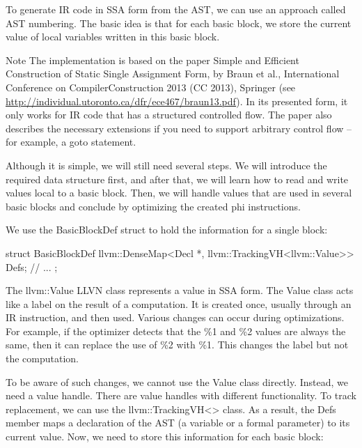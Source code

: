 
To generate IR code in SSA form from the AST, we can use an approach called AST numbering. The basic idea is that for each basic block, we store the current value of local variables written in this basic block.

\begin{myNotic}{Note}
The implementation is based on the paper Simple and Efficient Construction of Static Single Assignment Form, by Braun et al., International Conference on CompilerConstruction 2013 (CC 2013), Springer (see \url{http://individual.utoronto.ca/dfr/ece467/braun13.pdf}). In its presented form, it only works for IR code that has a structured controlled flow. The paper also describes the necessary extensions if you need to support arbitrary control flow – for example, a goto statement.
\end{myNotic}

Although it is simple, we will still need several steps. We will introduce the required data structure first, and after that, we will learn how to read and write values local to a basic block. Then, we will handle values that are used in several basic blocks and conclude by optimizing the created phi instructions.


We use the BasicBlockDef struct to hold the information for a single block:

\begin{cpp}
struct BasicBlockDef {
    llvm::DenseMap<Decl *, llvm::TrackingVH<llvm::Value>> Defs;
    // ...
};
\end{cpp}

The llvm::Value LLVN class represents a value in SSA form. The Value class acts like a label on the result of a computation. It is created once, usually through an IR instruction, and then used. Various changes can occur during optimizations. For example, if the optimizer detects that the \%1 and \%2 values are always the same, then it can replace the use of \%2 with \%1. This changes the label but not the computation.

To be aware of such changes, we cannot use the Value class directly. Instead, we need a value handle. There are value handles with different functionality. To track replacement, we can use the llvm::TrackingVH<> class. As a result, the Defs member maps a declaration of the AST (a variable or a formal parameter) to its current value. Now, we need to store this information for each basic block:

